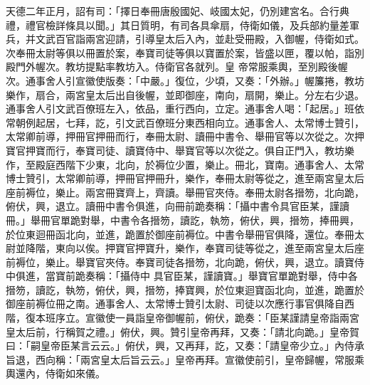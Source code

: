\begin{pinyinscope}
 天德二年正月，詔有司：「擇日奉冊唐殷國妃、岐國太妃，仍別建宮名。合行典禮，禮官檢詳條具以聞。」其日質明，有司各具傘扇，侍衛如儀，及兵部約量差軍兵，并文武百官詣兩宮迎請，引導皇太后入內，並赴受冊殿，入御幄，侍衛如式。次奉冊太尉等俱以冊置於案，奉寶司徒等俱以寶置於案，皆盛以匣，覆以帕，詣別殿門外幄次。教坊提點率教坊入。侍衛官各就列。皇
 帝常服乘輿，至別殿後幄次。通事舍人引宣徽使版奏：「中嚴。」復位，少頃，又奏：「外辦。」幄簾捲，教坊樂作，扇合，兩宮皇太后出自後幄，並即御座，南向，扇開，樂止。分左右少退。通事舍人引文武百僚班左入，依品，重行西向，立定。通事舍人喝：「起居。」班依常朝例起居，七拜，訖，引文武百僚班分東西相向立。通事舍人、太常博士贊引，太常卿前導，押冊官押冊而行，奉冊太尉、讀冊中書令、舉冊官等以次從之。次押寶官押寶而行，奉寶司徒、讀寶侍中、舉寶官等以次從之。俱自正門入，教坊樂作，至殿庭西階下少東，北向，於褥位少置，樂止。冊北，寶南。通事舍人、太常
 博士贊引，太常卿前導，押冊官押冊升，樂作，奉冊太尉等從之，進至兩宮皇太后座前褥位，樂止。兩宮冊寶齊上，齊讀。舉冊官夾侍。奉冊太尉各搢笏，北向跪，俯伏，興，退立。讀冊中書令俱進，向冊前跪奏稱：「攝中書令具官臣某，謹讀冊。」舉冊官單跪對舉，中書令各搢笏，讀訖，執笏，俯伏，興，搢笏，捧冊興，於位東迴冊函北向，並進，跪置於御座前褥位。中書令舉冊官俱降，還位。奉冊太尉並降階，東向以俟。押寶官押寶升，樂作，奉寶司徒等從之，進至兩宮皇太后座前褥位，樂止。舉寶官夾侍。奉寶司徒各搢笏，北向跪，俯伏，興，退立。讀寶侍中俱進，當寶前跪奏稱：「攝侍中
 具官臣某，謹讀寶。」舉寶官單跪對舉，侍中各搢笏，讀訖，執笏，俯伏，興，搢笏，捧寶興，於位東迴寶函北向，並進，跪置於御座前褥位冊之南。通事舍人、太常博士贊引太尉、司徒以次應行事官俱降自西階，復本班序立。宣徽使一員詣皇帝御幄前，俯伏，跪奏：「臣某謹請皇帝詣兩宮皇太后前，行稱賀之禮。」俯伏，興。贊引皇帝再拜，又奏：「請北向跪。」皇帝賀曰：「嗣皇帝臣某言云云。」俯伏，興，又再拜，訖，又奏：「請皇帝少立。」內侍承旨退，西向稱：「兩宮皇太后旨云云。」皇帝再拜。宣徽使前引，皇帝歸幄，常服乘輿還內，侍衛如來儀。




\end{pinyinscope}
